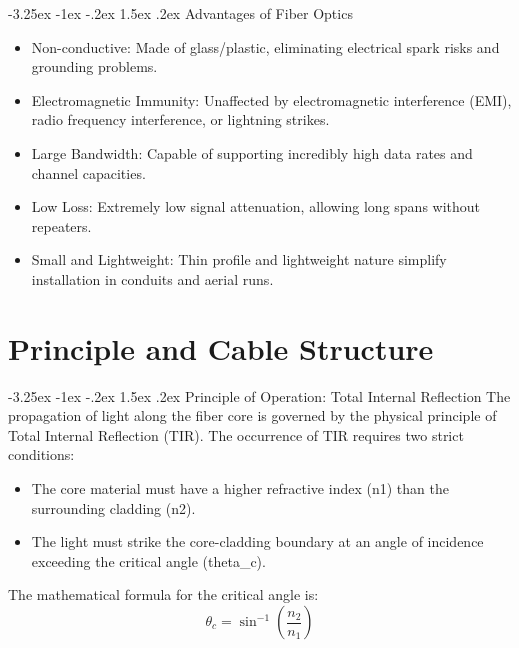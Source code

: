 \documentclass[11pt,a4paper]{report}
\makeatletter
\renewcommand{\section}{\@startsection{section}{1}{\z@}%
  {-3.25ex \@plus -1ex \@minus -.2ex}%
  {1.5ex \@plus.2ex}%
  {\normalfont\Large\bfseries\color{primaryColor}}}
\makeatother
\begin{document}
\section{Advantages of Fiber Optics}
\begin{itemize}
  \item Non-conductive: Made of glass/plastic, eliminating electrical spark risks and grounding problems.
  \item Electromagnetic Immunity: Unaffected by electromagnetic interference (EMI), radio frequency interference, or lightning strikes.
  \item Large Bandwidth: Capable of supporting incredibly high data rates and channel capacities.
  \item Low Loss: Extremely low signal attenuation, allowing long spans without repeaters.
  \item Small and Lightweight: Thin profile and lightweight nature simplify installation in conduits and aerial runs.
\end{itemize}
\chapter{Principle and Cable Structure}
\section{Principle of Operation: Total Internal Reflection}
The propagation of light along the fiber core is governed by the physical principle of Total Internal Reflection (TIR). The occurrence of TIR requires two strict conditions:
\begin{itemize}
  \item The core material must have a higher refractive index (n1) than the surrounding cladding (n2).
  \item The light must strike the core-cladding boundary at an angle of incidence exceeding the critical angle (theta\_c).
\end{itemize}
The mathematical formula for the critical angle is:
\begin{equation}\theta_c = \sin^{-1}\left( \frac{n_2}{n_1} \right)\end{equation}
\end{document}
